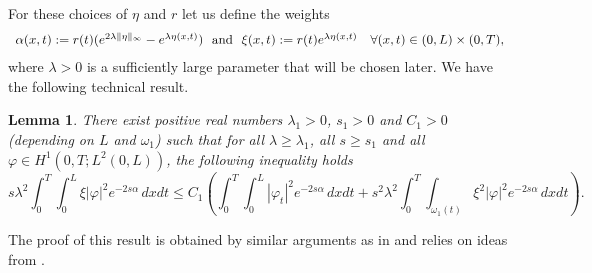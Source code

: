 \documentclass[10pt]{article}
\newtheorem{lemma}{Lemma}
\def\om{\omega}
\newcommand{\iiTL}{\int_0^T\!\!\!\!\int_0^L }
\begin{document}
    For these choices of $\eta$ and $r$ let us define the weights
\begin{equation}\label{alpha}
    \begin{array}{lr}
    \alpha (x,t) := r(t) (e^{2\lambda \|\eta \|_\infty} - e^{\lambda\eta (x,t)})~~\hbox{and}~~
    \xi (x,t) := r(t) e^{ \lambda \eta (x,t)}&\forall(x,t)\in (0,L)\times (0,T),
\end{array}
\end{equation}
    where $\lambda >0$ is a  sufficiently large parameter that will be chosen later. We have the following technical result.

\begin{lemma}
\label{lemma:ode}
    There exist positive real numbers $\lambda _1> 0$,  $s_1> 0$ and $C_1>0$ (depending on $L$ and $\om_1$) such that for all
    $\lambda \ge \lambda _1$, all $s\ge s_1$ and all $\varphi\in H^1(0,T;L^2(0,L))$, the following
    inequality  holds
\begin{equation}\label{carleman:ode}
    s\lambda^2\iiTL \!\xi|\varphi|^2e^{-2s\alpha}\,dxdt\le C_1\left(\iiTL |\varphi_t|^2e^{-2s\alpha}\, dxdt
    + s^2\lambda ^2\int_0^T\!\!\!\!\int_{\om_1(t)}\xi^2|\varphi|^2e^{-2s\alpha}\,dxdt\right).
\end{equation}
\end{lemma}
 The  proof of this result is obtained by similar arguments as in \cite[Appendix $C$]{CSZR} and relies on ideas from \cite{ALBANO}.
\end{document}

